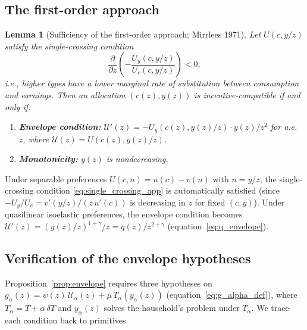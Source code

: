 \documentclass[12pt,a4paper]{article}
\theoremstyle{definition}
\theoremstyle{plain}
\newtheorem{lemma}{Lemma}[section]
\theoremstyle{remark}
\newcommand{\calU}{\mathcal{U}}
\begin{document}
\subsection{The first-order approach}

\begin{lemma}[Sufficiency of the first-order approach;
Mirrlees 1971]
\label{lem:FOA}
Let $U(c, y/z)$ satisfy the single-crossing condition
\begin{equation}
\label{eq:single_crossing_app}
  \frac{\partial}{\partial z}
  \left(-\frac{U_y(c, y/z)}{U_c(c, y/z)}\right) < 0,
\end{equation}
i.e., higher types have a lower marginal rate of
substitution between consumption and earnings.  Then an
allocation $(c(z), y(z))$ is incentive-compatible if and
only if:
\begin{enumerate}[label=(\roman*)]
\item \textbf{Envelope condition:}
  $\calU'(z) = -U_y(c(z), y(z)/z) \cdot y(z)/z^2$
  for a.e.\ $z$, where $\calU(z) = U(c(z), y(z)/z)$.
\item \textbf{Monotonicity:}
  $y(z)$ is nondecreasing.
\end{enumerate}
\end{lemma}

Under separable preferences $U(c,n) = u(c) - v(n)$
with $n = y/z$, the single-crossing condition
\eqref{eq:single_crossing_app} is automatically satisfied
(since $-U_y/U_c = v'(y/z)/(z\,u'(c))$ is decreasing in
$z$ for fixed $(c,y)$).  Under quasilinear isoelastic
preferences, the envelope condition becomes
$\calU'(z) = (y(z)/z)^{1+\gamma}/z = q(z)/z^{2+\gamma}$
(equation~\eqref{eq:q_envelope}).


\subsection{Verification of the envelope hypotheses}
\label{app:envelope_hyp}

Proposition~\ref{prop:envelope} requires three hypotheses
on $g_\alpha(z) = \psi(z)\,\calU_\alpha(z)
+ \mu\,T_\alpha(y_\alpha(z))$
(equation~\eqref{eq:g_alpha_def}), where
$T_\alpha = T + \alpha\,\delta T$ and $y_\alpha(z)$
solves the household's problem under $T_\alpha$.
We trace each condition back to primitives.
\end{document}
